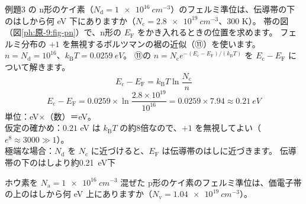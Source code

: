 \label{ph:原-9:ex5}
\begin{phreidai}[n形のフェルミ準位の位置]
例題3 の n形のケイ素（$N_{\mathrm d}=\qty{1e16}{cm^{-3}}$）のフェルミ準位は、伝導帯の下のはしから何 eV 下にありますか（$N_{\mathrm c}=\qty{2.8e19}{cm^{-3}}$、300 K）。
\phbamen
帯の図（図\ref{ph:原-9:fig-pn}）で、n形の $E_{\mathrm F}$ をかき入れるときの位置を求めます。
\phmushi
フェルミ分布の $+1$ を無視するボルツマンの裾の近似（⑪）を使います。
\phzu
$n=N_{\mathrm d}=10^{16}$、$k_{\mathrm B}T=\qty{0.0259}{eV}$。
\phriyu
⑪の $n=N_{\mathrm c}e^{-(E_{\mathrm c}-E_{\mathrm F})/(k_{\mathrm B}T)}$ を $E_{\mathrm c}-E_{\mathrm F}$ について解きます。
\phtateru
\[ E_{\mathrm c}-E_{\mathrm F}=k_{\mathrm B}T\ln\frac{N_{\mathrm c}}{n} \]
\phtoku
\[ E_{\mathrm c}-E_{\mathrm F}=0.0259\times\ln\frac{2.8\times10^{19}}{10^{16}}=0.0259\times7.94\approx\qty{0.21}{eV} \]
\phtashikame
単位：eV×（数）＝eV。\\
仮定の確かめ：$0.21$ eV は $k_{\mathrm B}T$ の約8倍なので、$+1$ を無視してよい（$e^{8}\approx3000\gg1$）。\\
極端な場合：$N_{\mathrm d}$ を $N_{\mathrm c}$ に近づけると、$E_{\mathrm F}$ は伝導帯のはしに近づきます。
\kotae 伝導帯の下のはしより約\qty{0.21}{eV}下
\end{phreidai}
\begin{jibun}
ホウ素を $N_{\mathrm a}=\qty{1e16}{cm^{-3}}$ 混ぜた p形のケイ素のフェルミ準位は、価電子帯の上のはしから何 eV 上にありますか（$N_{\mathrm v}=\qty{1.04e19}{cm^{-3}}$）。
\end{jibun}

